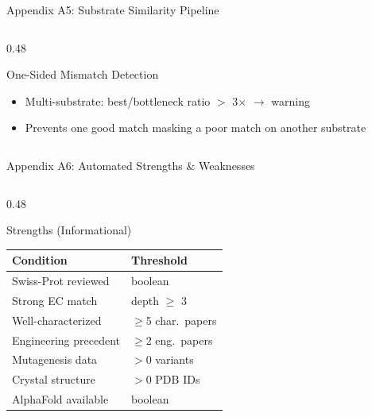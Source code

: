 \documentclass[aspectratio=169, 11pt]{beamer}
\begin{document}
\begin{frame}{Appendix A5: Substrate Similarity Pipeline}
\begin{columns}[T]
\begin{column}{0.48\textwidth}
\begin{block}{\small One-Sided Mismatch Detection}
\vspace{-2pt}
\begin{itemize}\scriptsize
\setlength\itemsep{0pt}
\item Multi-substrate: best/bottleneck ratio $>$ 3$\times$ $\rightarrow$ warning
\item Prevents one good match masking a poor match on another substrate
\end{itemize}
\end{block}
\end{column}
\end{columns}
\end{frame}

\begin{frame}{Appendix A6: Automated Strengths \& Weaknesses}
\vspace{-8pt}
\begin{columns}[T]
\begin{column}{0.48\textwidth}
\begin{exampleblock}{\small Strengths (Informational)}
\vspace{-2pt}
{\scriptsize
\begin{tabular}{@{}p{4.2cm} l@{}}
\toprule
\textbf{Condition} & \textbf{Threshold} \\
\midrule
Swiss-Prot reviewed & boolean \\
Strong EC match & depth $\geq$ 3 \\
Well-characterized & $\geq$5 char.\ papers \\
Engineering precedent & $\geq$2 eng.\ papers \\
Mutagenesis data & $>$0 variants \\
Crystal structure & $>$0 PDB IDs \\
AlphaFold available & boolean \\
\bottomrule
\end{tabular}
}
\end{exampleblock}


\end{column}
\end{columns}
\end{frame}
\end{document}
